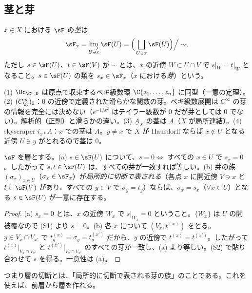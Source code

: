 \subsection{茎と芽}
\begin{defn}[茎・芽]
$x\in X$ における $\sF$ の\emph{茎}は
\[
\sF_x=\varinjlim_{U\ni x}\sF(U)=\Big(\bigsqcup_{U\ni x}\sF(U)\Big)\Big/\sim,
\]
ただし $s\in\sF(U)$、$t\in\sF(V)$ が $\sim$ とは、$x$ の近傍 $W\subset U\cap V$ で $s|_W=t|_W$ となること。$s\in\sF(U)$ の類を $s_x\in\sF_x$（$x$ における\emph{芽}）という。
\end{defn}
\begin{ex}\label{ex:stalks}
(1) $\Oc_{\C^n,0}$ は原点で収束するベキ級数環 $\C\{z_1,\dots,z_n\}$ に同型（一意の定理）。(2) $(C^\infty_{\R})_0$：$0$ の近傍で定義された滑らかな関数の芽。ベキ級数展開は $C^\infty$ の芽の情報を完全には決めない（$e^{-1/x^2}$ はテイラー級数が $0$ だが芽としては $0$ でない）。解析的（正則）と滑らかの違い。(3) $\underline A_X$ の茎は $A$（$X$ が局所連結）。(4) skyscraper $i_{x*}A$：$x$ での茎は $A$。$y\ne x$ で $X$ が Hausdorff ならば $x\notin U$ となる近傍 $U\ni y$ がとれるので茎は $0$。
\end{ex}

\begin{prop}\label{prop:germ}\tP
$\sF$ を層とする。(a) $s\in\sF(U)$ について、$s=0\iff$ すべての $x\in U$ で $s_x=0$。したがって $s,t\in\sF(U)$ は、すべての芽が一致すれば等しい。(b) 芽の族 $(\sigma_x)_{x\in U}$（$\sigma_x\in\sF_x$）が\emph{局所的に切断で表される}（各点 $x$ に開近傍 $V\ni x$ と $t\in\sF(V)$ があり、すべての $y\in V$ で $\sigma_y=t_y$）ならば、$\sigma_x=s_x$（$\forall x\in U$）となる $s\in\sF(U)$ が一意に存在する。
\end{prop}
\begin{proof}
(a) $s_x=0$ とは、$x$ の近傍 $W_x$ で $s|_{W_x}=0$ ということ。$\{W_x\}$ は $U$ の開被覆なので (S1) より $s=0$。(b) 各 $x$ について $(V_x,t^{(x)})$ をとる。$y\in V_x\cap V_{x'}$ で $t^{(x)}_y=\sigma_y=t^{(x')}_y$ だから、$y$ の近傍で $t^{(x)}=t^{(x')}$。したがって $t^{(x)}|_{V_x\cap V_{x'}}$ と $t^{(x')}|_{V_x\cap V_{x'}}$ のすべての芽が一致し、(a) より等しい。(S2) で貼り合わせて $s$ を得る。一意性は (a)。\qedhere
\end{proof}
つまり層の切断とは、「局所的に切断で表される芽の族」のことである。これを使えば、前層から層を作れる。

